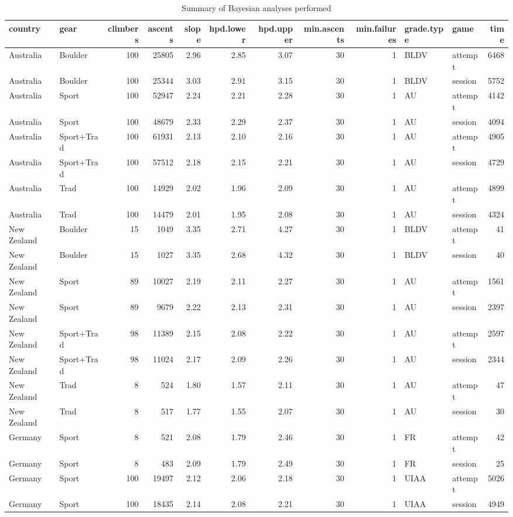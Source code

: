 \begin{table}[ht]
\centering
\fontsize{9pt}{10pt}\selectfont
\begin{tabular}{llrrrrrrrllr}
  \hline
{\bf country} & {\bf gear} & {\bf climbers} & {\bf ascents} & {\bf slope} & {\bf hpd.lower} & {\bf hpd.upper} & {\bf min.ascents} & {\bf min.failures} & {\bf grade.type} & {\bf game} & {\bf time} \\ 
  \hline
Australia & Boulder & 100 & 25805 & 2.96 & 2.85 & 3.07 &  30 &   1 & BLDV & attempt & 6468 \\ 
  Australia & Boulder & 100 & 25344 & 3.03 & 2.91 & 3.15 &  30 &   1 & BLDV & session & 5752 \\ 
  Australia & Sport & 100 & 52947 & 2.24 & 2.21 & 2.28 &  30 &   1 & AU & attempt & 4142 \\ 
  Australia & Sport & 100 & 48679 & 2.33 & 2.29 & 2.37 &  30 &   1 & AU & session & 4094 \\ 
  Australia & Sport+Trad & 100 & 61931 & 2.13 & 2.10 & 2.16 &  30 &   1 & AU & attempt & 4905 \\ 
  Australia & Sport+Trad & 100 & 57512 & 2.18 & 2.15 & 2.21 &  30 &   1 & AU & session & 4729 \\ 
  Australia & Trad & 100 & 14929 & 2.02 & 1.96 & 2.09 &  30 &   1 & AU & attempt & 4899 \\ 
  Australia & Trad & 100 & 14479 & 2.01 & 1.95 & 2.08 &  30 &   1 & AU & session & 4324 \\ 
  New Zealand & Boulder &  15 & 1049 & 3.35 & 2.71 & 4.27 &  30 &   1 & BLDV & attempt &  41 \\ 
  New Zealand & Boulder &  15 & 1027 & 3.35 & 2.68 & 4.32 &  30 &   1 & BLDV & session &  40 \\ 
  New Zealand & Sport &  89 & 10027 & 2.19 & 2.11 & 2.27 &  30 &   1 & AU & attempt & 1561 \\ 
  New Zealand & Sport &  89 & 9679 & 2.22 & 2.13 & 2.31 &  30 &   1 & AU & session & 2397 \\ 
  New Zealand & Sport+Trad &  98 & 11389 & 2.15 & 2.08 & 2.22 &  30 &   1 & AU & attempt & 2597 \\ 
  New Zealand & Sport+Trad &  98 & 11024 & 2.17 & 2.09 & 2.26 &  30 &   1 & AU & session & 2344 \\ 
  New Zealand & Trad &   8 & 524 & 1.80 & 1.57 & 2.11 &  30 &   1 & AU & attempt &  47 \\ 
  New Zealand & Trad &   8 & 517 & 1.77 & 1.55 & 2.07 &  30 &   1 & AU & session &  30 \\ 
  Germany & Sport &   8 & 521 & 2.08 & 1.79 & 2.46 &  30 &   1 & FR & attempt &  42 \\ 
  Germany & Sport &   8 & 483 & 2.09 & 1.79 & 2.49 &  30 &   1 & FR & session &  25 \\ 
  Germany & Sport & 100 & 19497 & 2.12 & 2.06 & 2.18 &  30 &   1 & UIAA & attempt & 5026 \\ 
  Germany & Sport & 100 & 18435 & 2.14 & 2.08 & 2.21 &  30 &   1 & UIAA & session & 4949 \\ 
   \hline
\end{tabular}
\caption{Summary of Bayesian analyses performed} 
\label{datatable}
\end{table}
